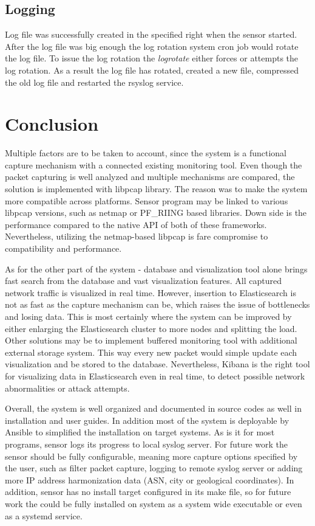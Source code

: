 \documentclass[12pt,a4paper,twoside]{report}
\begin{document}
	\section{Logging}
		Log file was successfully created in the specified right when the sensor started. After the log file was big enough the log rotation system cron job would rotate the log file. To issue the log rotation the \emph{logrotate} either forces or attempts the log rotation. As a result the log file has rotated, created a new file, compressed the old log file and restarted the rsyslog service.		
\chapter{Conclusion}
	Multiple factors are to be taken to account, since the system is a functional capture mechanism with a connected existing monitoring tool. Even though the packet capturing is well analyzed and multiple mechanisms are compared, the solution is implemented with libpcap library. The reason was to make the system more compatible across platforms. Sensor program may be linked to various libpcap versions, such as netmap or PF\_RIING based libraries. Down side is the performance compared to the native API of both of these frameworks. Nevertheless, utilizing the netmap-based libpcap is fare compromise to compatibility and performance.\par
	As for the other part of the system - database and visualization tool alone brings fast search from the database and vast visualization features. All captured network traffic is visualized in real time. However, insertion to Elasticsearch is not as fast as the capture mechanism can be, which raises the issue of bottlenecks and losing data. This is most certainly where the system can be improved by either enlarging the Elasticsearch cluster to more nodes and splitting the load. Other solutions may be to implement buffered monitoring tool with additional external storage system. This way every new packet would simple update each visualization and be stored to the database. Nevertheless, Kibana is the right tool for visualizing data in Elasticsearch even in real time, to detect possible network abnormalities or attack attempts.\par
	Overall, the system is well organized and documented in source codes as well in installation and user guides. In addition most of the system is deployable by Ansible to simplified the installation on target systems. As is it for most programs, sensor logs its progress to local syslog server. For future work the sensor should be fully configurable, meaning more capture options specified by the user, such as filter packet capture, logging to remote syslog server or adding more IP address harmonization data (ASN, city or geological coordinates). In addition, sensor has no install target configured in its make file, so for future work the could be fully installed on system as a system wide executable or even as a systemd service.\par
\end{document}
